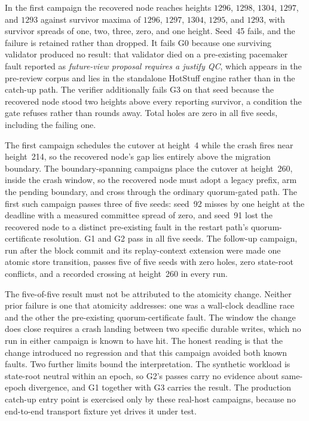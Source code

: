 \documentclass[journal]{IEEEtran}
\theoremstyle{definition}
\theoremstyle{remark}
\begin{document}
In the first campaign the recovered node reaches heights $1296$, $1298$, $1304$, $1297$, and $1293$
against survivor maxima of $1296$, $1297$, $1304$, $1295$, and $1293$, with survivor spreads of one,
two, three, zero, and one height. Seed~45 fails, and the failure is retained rather than dropped. It
fails G0 because one surviving validator produced no result: that validator died on a pre-existing
pacemaker fault reported as \emph{future-view proposal requires a justify QC}, which appears in the
pre-review corpus and lies in the standalone HotStuff engine rather than in the catch-up path. The
verifier additionally fails G3 on that seed because the recovered node stood two heights above every
reporting survivor, a condition the gate refuses rather than rounds away. Total holes are zero in all
five seeds, including the failing one.

The first campaign schedules the cutover at height~4 while the crash fires near height~214, so the
recovered node's gap lies entirely above the migration boundary. The boundary-spanning campaigns
place the cutover at height~260, inside the crash window, so the recovered node must adopt a legacy
prefix, arm the pending boundary, and cross through the ordinary quorum-gated path. The first such
campaign passes three of five seeds: seed~92 misses by one height at the deadline with a measured
committee spread of zero, and seed~91 lost the recovered node to a distinct pre-existing fault in the
restart path's quorum-certificate resolution. G1 and G2 pass in all five seeds. The follow-up
campaign, run after the block commit and its replay-context extension were made one atomic store
transition, passes five of five seeds with zero holes, zero state-root conflicts, and a recorded
crossing at height~260 in every run.

The five-of-five result must not be attributed to the atomicity change. Neither prior failure is one
that atomicity addresses: one was a wall-clock deadline race and the other the pre-existing
quorum-certificate fault. The window the change does close requires a crash landing between two
specific durable writes, which no run in either campaign is known to have hit. The honest reading is
that the change introduced no regression and that this campaign avoided both known faults. Two
further limits bound the interpretation. The synthetic workload is state-root neutral within an
epoch, so G2's passes carry no evidence about same-epoch divergence, and G1 together with G3 carries
the result. The production catch-up entry point is exercised only by these real-host campaigns,
because no end-to-end transport fixture yet drives it under test.
\end{document}

